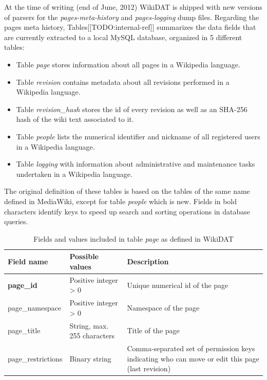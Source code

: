 At the time of writing (end of June, 2012) WikiDAT is shipped with new versions of
parsers for the \textit{pages-meta-history} and \textit{pages-logging} dump files.
Regarding the pages meta history, Tables[[TODO:internal-ref]] summarizes the data
fields that are currently extracted to a local MySQL database, organized in 5 different
tables:

\begin{itemize}
 \item Table \textit{page} stores information about all pages in a Wikipedia language.
 \item Table \textit{revision} contains metadata about all revisions performed in a
 Wikipedia language.
 \item Table \textit{revision\_hash} stores the id of every revision as well as
 an SHA-256 hash of the wiki text associated to it. 
 \item Table \textit{people} lists the numerical identifier and nickname of all
 registered users in a Wikipedia language.
 \item Table \textit{logging} with information about administrative and maintenance
 tasks undertaken in a Wikipedia language.
\end{itemize}

The original definition of these tables is based on the tables of the same name
defined in MediaWiki, except for table \textit{people} which is new. Fields in
bold characters identify keys to speed up search and sorting operations in database
queries.

\begin{longtable}[l]{|m{4.5cm}|m{5cm}|m{5cm}|}
 \caption[Table page in WikiDAT]
  {Fields and values included in table \textit{page} as defined in WikiDAT}
  \label{tab:table-page}\\
  \hline
  {\bfseries Field name} & {\bfseries Possible values} & {\bfseries Description}\\
  \hline
  {\bfseries page\_id} & Positive integer > 0 & Unique numerical id of the page \\
  \hline
  page\_namespace & Positive integer > 0  & Namespace of the page \\
  \hline
  page\_title & String, max. 255 characters & Title of the page \\
  \hline
  page\_restrictions & Binary string & Comma-separated set of permission keys 
  indicating who can move or edit this page (last revision)\\
  \hline
\end{longtable}

